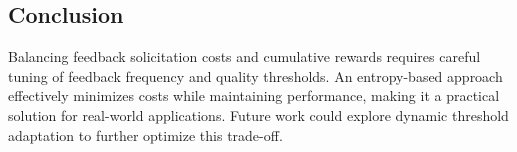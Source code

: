 \subsection{Conclusion}

Balancing feedback solicitation costs and cumulative rewards requires careful tuning of feedback frequency and quality thresholds. An entropy-based approach effectively minimizes costs while maintaining performance, making it a practical solution for real-world applications. Future work could explore dynamic threshold adaptation to further optimize this trade-off.

